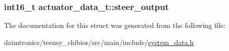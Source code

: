 \subsubsection[{\texorpdfstring{steer\+\_\+output}{steer_output}}]{\setlength{\rightskip}{0pt plus 5cm}int16\+\_\+t actuator\+\_\+data\+\_\+t\+::steer\+\_\+output}\hypertarget{structactuator__data__t_acf5132436492fb9e558cf10d0b6b645c}{}\label{structactuator__data__t_acf5132436492fb9e558cf10d0b6b645c}


The documentation for this struct was generated from the following file\+:\begin{DoxyCompactItemize}
\item 
daimtronics/teensy\+\_\+chibios/src/main/include/\hyperlink{teensy__chibios_2src_2main_2include_2system__data_8h}{system\+\_\+data.\+h}\end{DoxyCompactItemize}
